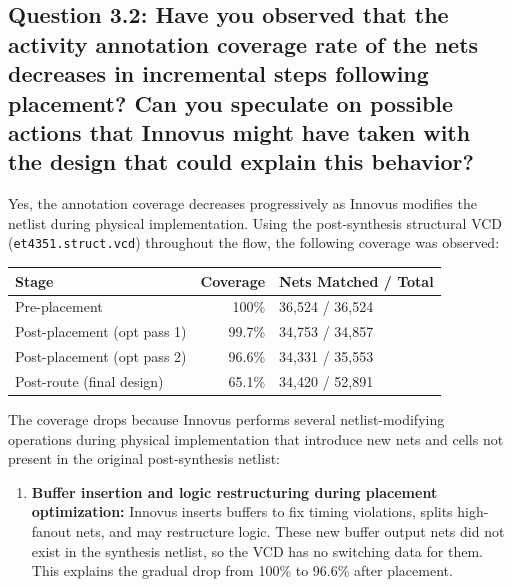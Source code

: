 \documentclass{article}
\begin{document}
\begin{tcolorbox}[colback=white, colframe=black, width=\textwidth, title=Answer 3.1]
\end{tcolorbox}

\newpage

\subsection*{Question 3.2: Have you observed that the activity annotation coverage rate of the nets decreases in incremental steps following placement? Can you speculate on possible actions that Innovus might have taken with the design that could explain this behavior?}

\begin{tcolorbox}[colback=white, colframe=black, width=\textwidth, title=Answer 3.2]

Yes, the annotation coverage decreases progressively as Innovus modifies the netlist during physical implementation. Using the post-synthesis structural VCD (\texttt{et4351.struct.vcd}) throughout the flow, the following coverage was observed:

\vspace{0.2cm}

\begin{tabular}{@{}lrl@{}}
\toprule
\textbf{Stage} & \textbf{Coverage} & \textbf{Nets Matched / Total} \\
\midrule
Pre-placement   & 100\%   & 36{,}524 / 36{,}524 \\
Post-placement (opt pass 1) & 99.7\%  & 34{,}753 / 34{,}857 \\
Post-placement (opt pass 2) & 96.6\%  & 34{,}331 / 35{,}553 \\
Post-route (final design)   & 65.1\%  & 34{,}420 / 52{,}891 \\
\bottomrule
\end{tabular}

\vspace{0.3cm}

The coverage drops because Innovus performs several netlist-modifying operations during physical implementation that introduce new nets and cells not present in the original post-synthesis netlist:

\begin{enumerate}
\item \textbf{Buffer insertion and logic restructuring during placement optimization:} Innovus inserts buffers to fix timing violations, splits high-fanout nets, and may restructure logic. These new buffer output nets did not exist in the synthesis netlist, so the VCD has no switching data for them. This explains the gradual drop from 100\% to 96.6\% after placement.


\end{enumerate}
\end{tcolorbox}
\end{document}
